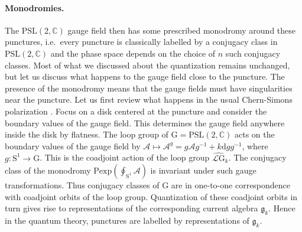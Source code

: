 \documentclass[12pt,a4paper]{article}
\newcommand\PSL{\text{PSL}}
\newcommand\CC{\mathbb{C}}
\renewcommand\d{\text{d}}
\renewcommand{\S}{\mathrm{S}}
\begin{document}
\paragraph{Monodromies.} The $\PSL(2,\CC)$ gauge field then has some prescribed monodromy around these punctures, i.e.\ every puncture is classically labelled by a conjugacy class in $\PSL(2,\CC)$ and the phase space depends on the choice of $n$ such conjugacy classes.
Most of what we discussed about the quantization remains unchanged, but let us discuss what happens to the gauge field close to the puncture. The presence of the monodromy means that the gauge fields must have singularities near the puncture. Let us first review what happens in the usual Chern-Simons polarization \cite{Elitzur:1989nr}. 
 Focus on a disk centered at the puncture and consider the boundary values of the gauge field. This determines the gauge field anywhere inside the disk by flatness. The loop group of $\mathrm{G}=\PSL(2,\CC)$ acts on the boundary values of the gauge field by $\mathcal{A} \mapsto \mathcal{A}^g=g \mathcal{A} g^{-1}+k \d g g^{-1}$, where $g: \S^1 \longrightarrow \mathrm{G}$. This is the coadjoint action of the loop group $\widehat{\mathscr{L}\mathrm{G}}_k$. The conjugacy class of the monodromy $\text{Pexp}\left(\oint_{\S^1} \mathcal{A} \right)$ is invariant under such gauge transformations. Thus conjugacy classes of $\mathrm{G}$ are in one-to-one correspondence with coadjoint orbits of the loop group. Quantization of these coadjoint orbits in turn gives rise to representations of the corresponding current algebra $\mathfrak{g}_k$. 
 Hence in the quantum theory, punctures are labelled by representations of $\mathfrak{g}_k$.
\end{document}
